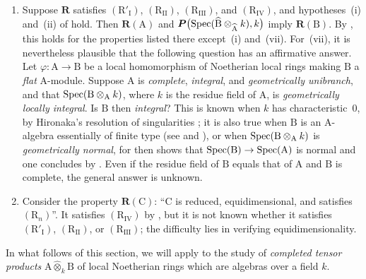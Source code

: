 \begin{remarks}[7.5.4]
\begin{enumerate}[label=(\roman*)]
  \item Suppose $\boldsymbol{R}$ satisfies $(\mathrm{R}'_{\mathrm{I}})$, $(\mathrm{R}_{\mathrm{II}})$, $(\mathrm{R}_{\mathrm{III}})$, and $(\mathrm{R}_{\mathrm{IV}})$, and hypotheses~(i) and~(ii) of  hold. Then $\boldsymbol{R}(\mathrm{A})$ and $\boldsymbol{P}\bigl(\operatorname{Spec}(\widehat{\mathrm{B}}\otimes_{\widehat{\mathrm{A}}}k),k\bigr)$
  imply $\boldsymbol{R}(\mathrm{B})$. By , this holds for the properties listed there except~(i) and~(vii). For~(vii), it is nevertheless plausible that the following question has an affirmative answer. Let $\varphi:\mathrm{A}\to\mathrm{B}$ be a local homomorphism of Noetherian local rings making $\mathrm{B}$ a \emph{flat} $\mathrm{A}$-module. Suppose $\mathrm{A}$ is \emph{complete}, \emph{integral}, and \emph{geometrically unibranch}, and that $\operatorname{Spec}(\mathrm{B}\otimes_\mathrm{A}k)$, where $k$ is the residue field of $\mathrm{A}$, is \emph{geometrically locally integral}. Is $\mathrm{B}$ then \emph{integral}? This is known when $k$ has characteristic~$0$, by Hironaka's resolution of singularities ; it is also true when $\mathrm{B}$ is an $\mathrm{A}$-algebra essentially of finite type  (see  and ), or when $\operatorname{Spec}(\mathrm{B}\otimes_\mathrm{A}k)$ is \emph{geometrically normal}, for then  shows that $\operatorname{Spec}(\mathrm{B})\to\operatorname{Spec}(\mathrm{A})$ is normal and one concludes by . Even if the residue field of $\mathrm{B}$ equals that of $\mathrm{A}$ and $\mathrm{B}$ is complete, the general answer is unknown.

  \item Consider the property $\boldsymbol{R}(\mathrm{C})$: ``$\mathrm{C}$ is reduced, equidimensional, and satisfies $(\mathrm{R}_n)$''. It satisfies $(\mathrm{R}_{\mathrm{IV}})$ by , but it is not known whether it satisfies $(\mathrm{R}'_{\mathrm{I}})$, $(\mathrm{R}_{\mathrm{II}})$, or $(\mathrm{R}_{\mathrm{III}})$; the difficulty lies in verifying equidimensionality.
\end{enumerate}
\end{remarks}


In what follows of this section, we will apply  to the study of \emph{completed tensor products} $\mathrm{A}\widehat{\otimes}_k\mathrm{B}$ of local Noetherian rings which are algebras over a field $k$.

